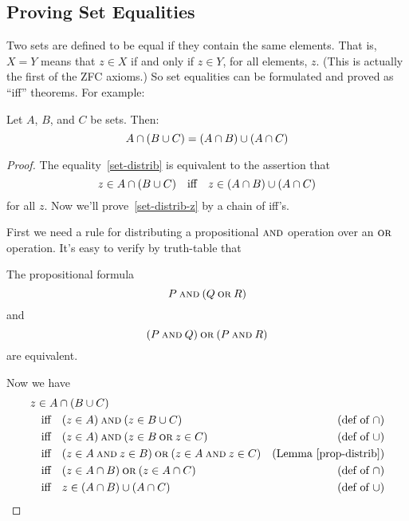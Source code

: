 \subsection{Proving Set Equalities}

Two sets are defined to be equal if they contain the same elements.  That
is, $X = Y$ means that $z \in X$ if and only if $z \in Y$, for all
elements, $z$.  (This is actually the first of the ZFC axioms.)  So set
equalities can be formulated and proved as ``iff'' theorems.  For
example:

\begin{theorem}
Let $A$, $B$, and $C$ be sets.  Then:
\begin{equation}\label{set-distrib}
A \cap (B \cup C) = (A \cap B) \cup (A \cap C)
\end{equation}
\end{theorem}

\begin{proof}
The equality~\eqref{set-distrib} is equivalent to the assertion that
\begin{equation}\label{set-distrib-z}
  z \in A \cap (B \cup C) \quad \text{iff} \quad z \in (A \cap B)
  \cup (A \cap C)
\end{equation}
for all $z$.  Now we'll prove~\eqref{set-distrib-z} by a chain of iff's.

First we need a rule for distributing a propositional $\mathbin{\mathrm{\textsc{and}}}$ operation
over an $\mathbin{\mathrm{\textsc{or}}}$ operation.  It's easy to verify by truth-table that
\begin{lemma}\label{prop-distrib}
The propositional formula
\[
P \mathbin{\mathrm{\textsc{and}}} (Q \mathbin{\mathrm{\textsc{or}}} R)
\]
and
\[
(P \mathbin{\mathrm{\textsc{and}}} Q) \mathbin{\mathrm{\textsc{or}}} (P \mathbin{\mathrm{\textsc{and}}} R)
\]
are equivalent.
\end{lemma}

Now we have
\begin{align*}
\lefteqn{z \in A \intersect (B \union C)}\\
& \qiff (z \in A) \QAND (z \in B \union C) & \text{(def of $\intersect$)}\\
& \qiff (z \in A) \QAND (z \in B \QOR z \in C)
                & \text{(def of $\union$)}\\
& \qiff (z \in A \QAND z \in B) \QOR (z \in A \QAND z \in C)
                & \text{(Lemma~\ref{prop-distrib})}\\
& \qiff (z \in A \intersect B) \QOR (z \in A \intersect C)
                & \text{(def of $\intersect$)}\\
& \qiff z \in (A \intersect B) \union (A \intersect C)
                & \text{(def of $\union$)}
\end{align*}

\end{proof}
  
